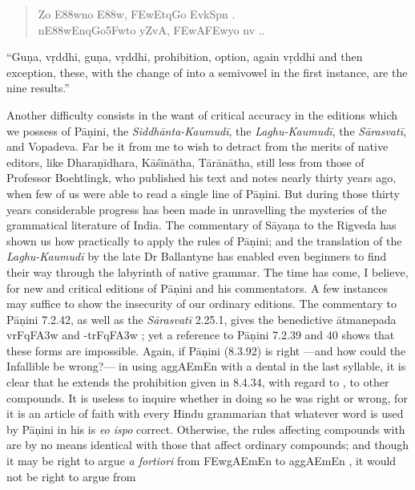 \begin{quote}
  {\dn {}Zo E\388w\0no E\388w, \3FEwEtq\?Go EvkSpn\2 .} \\
  {\dn {}n\0E\388wEn\0q\?Go\35Fwto yZvA\0, \3FEwA\3FEwyo nv ..}
\end{quote}

``Guṇa, vṛddhi, guṇa, vṛddhi, prohibition, option, again vṛddhi and then
exception, these, with the change of  into a semivowel in the
first instance, are the nine results.''

Another difficulty consists in the want of critical accuracy in the
editions which we possess of Pāṇini, the \emph{Siddhānta-Kaumudī}, the
\emph{Laghu-Kaumudī}, the \emph{Sārasvatī}, and Vopadeva. Far be it from
me to wish to detract from the merits of native editors, like
Dharaṇīdhara, Kāśīnātha, Tārānātha, still less from those of Professor
Boehtlingk, who published his text and notes nearly thirty years ago,
when few of us were able to read a single line of Pāṇini. But during
those thirty years considerable progress has been made in unravelling
the mysteries of the grammatical literature of India. The commentary of
Sāyaṇa to the Rigveda has shown us how practically to apply the rules of
Pāṇini; and the translation of the \emph{Laghu-Kaumudī} by the late Dr
Ballantyne has enabled even beginners to find their way through the
labyrinth of native grammar. The time has come, I believe, for new and
critical editions of Pāṇini and his commentators. A few instances may
suffice to show the insecurity of our ordinary editions. The commentary
to Pāṇini 7.2.42, as well as the \emph{Sārasvatī} 2.25.1, gives the
benedictive ātmanepada {\dn vrFqF\3A3w}  and
{\dn -trFqF\3A3w} ; yet a reference to Pāṇini 7.2.39 and
40 shows that these forms are impossible. Again, if Pāṇini (8.3.92) is
right%
—and how could the Infallible be wrong?—%
%
in using {\dn ag\5gAEmEn}  with a dental  in the last
syllable, it is clear that he extends the prohibition given in 8.4.34,
with regard to , to other compounds. It is useless to
inquire whether in doing so he was right or wrong, for it is an article
of faith with every Hindu grammarian that whatever word is used by
Pāṇini in his  is \emph{eo ispo} correct. Otherwise, the
rules affecting compounds with  are by no means identical
with those that affect ordinary compounds; and though it may be right to
argue \emph{a fortiori} from {\dn \3FEwgAEmEn}  to
{\dn ag\5gAEmEn} , it would not be right to argue from
